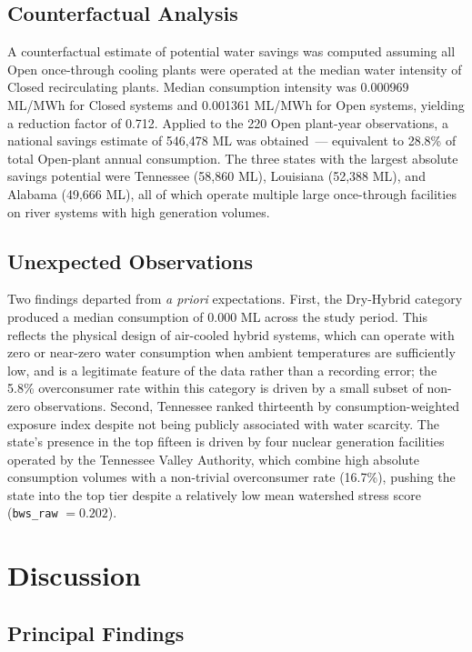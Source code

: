 \documentclass[11pt, letterpaper]{article}
\begin{document}
\subsection{Counterfactual Analysis}

A counterfactual estimate of potential water savings was computed assuming all Open once-through cooling plants were operated at the median water intensity of Closed recirculating plants. Median consumption intensity was 0.000969 ML/MWh for Closed systems and 0.001361 ML/MWh for Open systems, yielding a reduction factor of 0.712. Applied to the 220 Open plant-year observations, a national savings estimate of 546{,}478 ML was obtained~--- equivalent to 28.8\% of total Open-plant annual consumption. The three states with the largest absolute savings potential were Tennessee (58{,}860 ML), Louisiana (52{,}388 ML), and Alabama (49{,}666 ML), all of which operate multiple large once-through facilities on river systems with high generation volumes.

\subsection{Unexpected Observations}

Two findings departed from \textit{a priori} expectations. First, the Dry-Hybrid category produced a median consumption of 0.000 ML across the study period. This reflects the physical design of air-cooled hybrid systems, which can operate with zero or near-zero water consumption when ambient temperatures are sufficiently low, and is a legitimate feature of the data rather than a recording error; the 5.8\% overconsumer rate within this category is driven by a small subset of non-zero observations. Second, Tennessee ranked thirteenth by consumption-weighted exposure index despite not being publicly associated with water scarcity. The state's presence in the top fifteen is driven by four nuclear generation facilities operated by the Tennessee Valley Authority, which combine high absolute consumption volumes with a non-trivial overconsumer rate (16.7\%), pushing the state into the top tier despite a relatively low mean watershed stress score (\texttt{bws\_raw} $= 0.202$).

\section{Discussion}

\subsection{Principal Findings}
\end{document}
